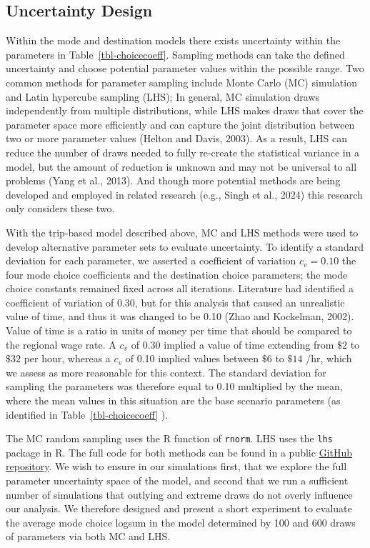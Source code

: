 \documentclass[
  futuretransp,
  submit,
  moreauthors,
]{Definitions/mdpi}
\begin{document}
\subsection{Uncertainty Design}\label{uncertainty-design}

Within the mode and destination models there exists uncertainty within
the parameters in Table~\ref{tbl-choicecoeff}. Sampling methods can take
the defined uncertainty and choose potential parameter values within the
possible range. Two common methods for parameter sampling include Monte
Carlo (MC) simulation and Latin hypercube sampling (LHS);  
In general, MC simulation
draws independently from multiple distributions, while LHS makes draws
that cover the parameter space more efficiently and can capture the
joint distribution between two or more parameter values (Helton and
Davis, 2003). As a result, LHS can reduce the number of draws needed to
fully re-create the statistical variance in a model, but the amount of
reduction is unknown and may not be universal to all problems (Yang et
al., 2013).  And though more potential
methods are being developed and employed in related research (e.g., Singh et al., 2024) 
this research only considers these two.

With the trip-based model described above, MC and LHS methods were used
to develop alternative parameter sets to evaluate uncertainty. To
identify a standard deviation for each parameter, we asserted a coefficient of
variation \(c_v = 0.10 \) the four mode choice coefficients and the destination
choice parameters; the mode choice constants remained fixed across all iterations.
Literature had identified a coefficient of variation of 0.30, but for
this analysis that caused an unrealistic value of time, and thus it was
changed to be 0.10 (Zhao and Kockelman, 2002). Value of time is a ratio
in units of money per time that should be compared to the regional wage
rate. A \(c_v\) of 0.30 implied a value of time extending from \(\$2\)
to \(\$32\) per hour, whereas a \(c_v\) of 0.10 implied values between \(\$6\)
to \(\$14\) /hr, which we assess as more reasonable for this context.
The standard deviation for sampling the parameters was therefore equal to 0.10
multiplied by the mean, where the mean values in this situation are the base
scenario parameters (as identified in Table~\ref{tbl-choicecoeff} ).

The MC random sampling uses the R function of \texttt{rnorm}. LHS uses
the \texttt{lhs} package in R.  The full code for both methods can be found in a
public \href{https://github.com/natmaegray/sensitivity_thesis}{GitHub
repository}. We wish to ensure in our simulations first, that we explore the
full parameter uncertainty space of the model, and second that we run a
sufficient number of simulations that outlying and extreme draws do not overly
influence our analysis. We therefore designed and present a short experiment to
evaluate the average mode choice logsum in the model determined by 100 and 600
draws of parameters via both MC and LHS.
\end{document}

